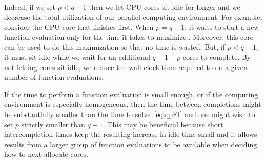 \documentclass[paper=letter]{scrartcl}
\newcommand{\qEI}{\text{\textit q-EI}}
\begin{document}
Indeed, if we set $p < q-1$ then we let CPU cores sit idle for longer and we decrease the total utilization of our parallel computing environment.  For example, consider the CPU core that finishes first.  When $p = q-1$, it waits to start a new function evaluation only for the time it takes to maximize \qEI.  Moreover, this core can be used to do this maximization so that no time is wasted.  But, if $p<q-1$, it must sit idle while we wait for an additional $q-1-p$ cores to complete.  By not letting cores sit idle, we reduce the wall-clock time required to do a given number of function evaluations.

If the time to perform a function evaluation is small enough, or if the computing environment is especially homogeneous, then the time between completions might be substantially smaller than the time to solve~\eqref{eq:qpEI} and one might wish to set $p$ strictly smaller than $q-1$. This may be beneficial because short intercompletion times keep the resulting increase in idle time small and 
it allows results from a larger group of function evaluations to be available when deciding how to next allocate cores.


\end{document}
